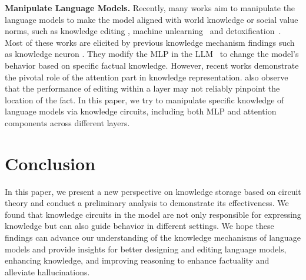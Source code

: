 \documentclass{article}
\begin{document}


\textbf{Manipulate Language Models.}
Recently, many works aim to manipulate the language models to make the model aligned with world knowledge or social value norms, such as knowledge editing \cite{yao-etal-2023-editing,knowledge_editing_survey_2}, machine unlearning~\cite{si2023knowledge,chen-yang-2023-unlearn} and detoxification~\cite{DBLP:conf/aaai/HuLHZLZ24,wang2024detoxifying}.
Most of these works are elicited by previous knowledge mechanism findings such as knowledge neuron \cite{KN}.
They modify the MLP in the LLM~\cite{meng2022locating,dai-etal-2022-knowledge} to change the model's behavior based on specific factual knowledge.
However, recent works \cite{li2023inferencetime,sakarvadia-etal-2023-memory} demonstrate the pivotal role of the attention part in knowledge representation.
\citet{hase2023does} also observe that the performance of editing within a layer may not reliably pinpoint the location of the fact.
In this paper, we try to manipulate specific knowledge of language models via knowledge circuits, including both MLP and attention components across different layers.

\section{Conclusion}
In this paper, we present a new perspective on knowledge storage based on circuit theory and conduct a preliminary analysis to demonstrate its effectiveness.
We found that knowledge circuits in the model are not only responsible for expressing knowledge but can also guide behavior in different settings.
We hope these findings can advance our understanding of the knowledge mechanisms of language models and provide insights for better designing and editing language models, enhancing knowledge, and improving reasoning to enhance factuality and alleviate hallucinations.
\end{document}
